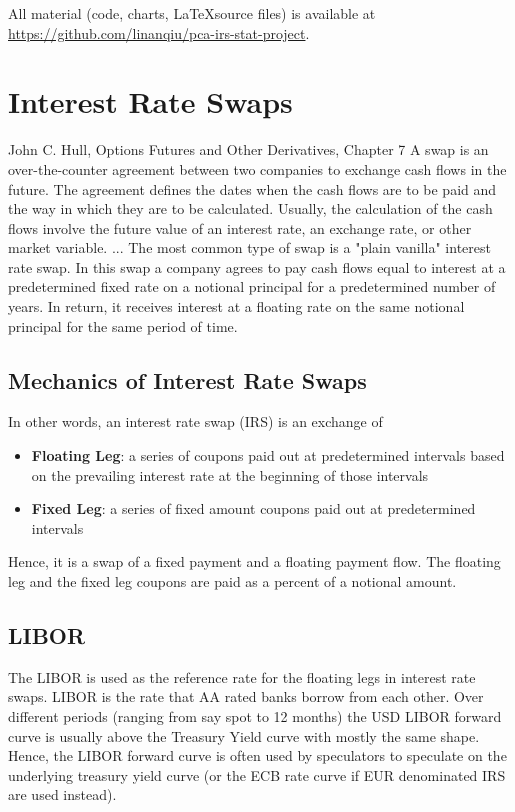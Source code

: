 All material (code, charts, \LaTeX source files) is available at \url{https://github.com/linanqiu/pca-irs-stat-project}.

\chapter{Interest Rate Swaps}
\begin{aquote}{John C. Hull, Options Futures and Other Derivatives, Chapter 7}
A swap is an over-the-counter agreement between two companies to exchange cash flows in the future. The agreement defines the dates when the cash flows are to be paid and the way in which they are to be calculated. Usually, the calculation of the cash flows involve the future value of an interest rate, an exchange rate, or other market variable. ... The most common type of swap is a "plain vanilla" interest rate swap. In this swap a company agrees to pay cash flows equal to interest at a predetermined fixed rate on a notional principal for a predetermined number of years. In return, it receives interest at a floating rate on the same notional principal for the same period of time.
\end{aquote}

\section{Mechanics of Interest Rate Swaps}

In other words, an interest rate swap (IRS) is an exchange of

\begin{itemize}
\item \textbf{Floating Leg}: a series of coupons paid out at predetermined intervals based on the prevailing interest rate at the beginning of those intervals
\item \textbf{Fixed Leg}: a series of fixed amount coupons paid out at predetermined intervals
\end{itemize}

Hence, it is a swap of a fixed payment and a floating payment flow. The floating leg and the fixed leg coupons are paid as a percent of a notional amount.

\section{LIBOR}
The LIBOR is used as the reference rate for the floating legs in interest rate swaps. LIBOR is the rate that AA rated banks borrow from each other. Over different periods (ranging from say spot to 12 months) the USD LIBOR forward curve is usually above the Treasury Yield curve with mostly the same shape. Hence, the LIBOR forward curve is often used by speculators to speculate on the underlying treasury yield curve (or the ECB rate curve if EUR denominated IRS are used instead).

